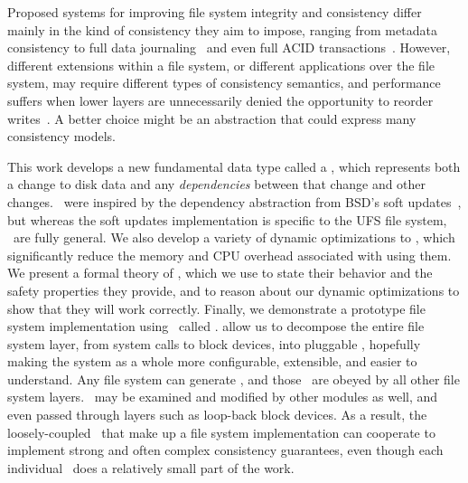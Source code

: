 Proposed systems for improving file system integrity and consistency differ
 mainly in the kind of consistency they aim to impose, ranging from
 metadata consistency to full data journaling~\cite{tweedie98journaling}
  and even full ACID
 transactions~\cite{gal05transactional,liskov04transactional}.
%
However, different extensions within a file system, or different
 applications over the file system, may require different types of
 consistency semantics, and performance suffers when lower layers are
 unnecessarily denied the opportunity to reorder
 writes~\cite{ganger00soft}.
%
A better choice might be an abstraction that could express many consistency
 models.


This work develops a new fundamental data type called a \emph{\chdesc},
 which represents both a change to disk data and any \emph{dependencies}
 between that change and other changes. 
%
\Chdescs\ were inspired by the dependency abstraction from BSD's
 soft updates~\cite{ganger00soft}, but whereas the soft updates implementation
 is specific to the UFS file system, \chdescs\ are fully general.
%
We also develop a variety of dynamic optimizations to \chdescs, which
 significantly reduce the memory and CPU overhead associated with using them.
%
We present a formal theory of \chdescs, which we use to state their
 behavior and the safety properties they provide, and to reason about our
 dynamic optimizations to show that they will work correctly.
%
Finally, we demonstrate a prototype file system implementation using
 \chdescs\ called \Kudos.
%
\Chdescs allow us to decompose the entire file system layer, from system
 calls to block devices, into pluggable \modules, hopefully making the
 system as a whole more configurable, extensible, and easier to understand.
%
Any file system can generate \chdescs, and those \chdescs\ are obeyed
 by all other file system layers.
%
\Chdescs\ may be examined and modified by other modules as well, and
 even passed through layers such as loop-back block devices.
%
As a result, the loosely-coupled \modules\ that make up a file system
 implementation can cooperate to implement strong and often complex
 consistency guarantees, even though each individual \module\ does a
 relatively small part of the work.


